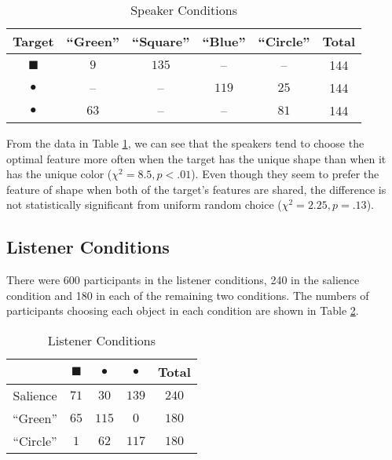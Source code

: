 \begin{table}[htb]   
  \caption{Speaker Conditions}
  \centering
  \begin{tabular}{c|ccccc}
   Target  & ``Green'' & ``Square'' & ``Blue'' & ``Circle'' & Total\\ 
     \hline
\textcolor{green!65}{\large{$\blacksquare$}}    & $9$        &   $135$   & -- & -- &144\\
\textcolor{blue!65}{\Huge{$\bullet$}}           & --        &   --      & $119$ & $25$ & 144\\
\textcolor{green!65}{\Huge{$\bullet$}}          & $63$        &   --    &  --   & $81$             &144
  \end{tabular}

  \label{table:speaker}
\end{table}

From the data in Table \ref{table:speaker}, we can see that the
speakers tend to choose the optimal feature more often when the target
has the unique shape than when it has the unique color ($\chi^2=8.5,
p<.01$). Even though they seem to prefer the feature of shape when
both of the target's features are shared, the difference is not
statistically significant from uniform random choice ($\chi^2=2.25,
p=.13$).


\subsection{Listener Conditions}

There were 600 participants in the listener conditions, 240 in the salience condition and 180 in each of the remaining two conditions. The numbers of participants choosing each object in each condition are shown in Table \ref{table:listener}. 

\begin{table}[htb] 
  \caption{Listener Conditions}
  \centering
\begin{tabular}{c|cccc}
   & \quad \textcolor{green!65}{\Large{$\blacksquare$}}&  \textcolor{green!65}{\Huge{$\bullet$}}& \textcolor{blue!65}{\Huge{$\bullet$}} & Total\\ 
     \hline
 Salience   \quad  & \quad  $71$      \quad    &   $30$    \quad     & $139$ \quad     & $240$      \\
 ``Green''   \quad  & \quad  $65$      \quad    &   $115$    \quad     & $0$ \quad     & $180$     \\
 ``Circle''   &  \quad $1$        &    $62$        & $117$ \quad     & $180$
  \end{tabular}

  \label{table:listener}
\end{table}

